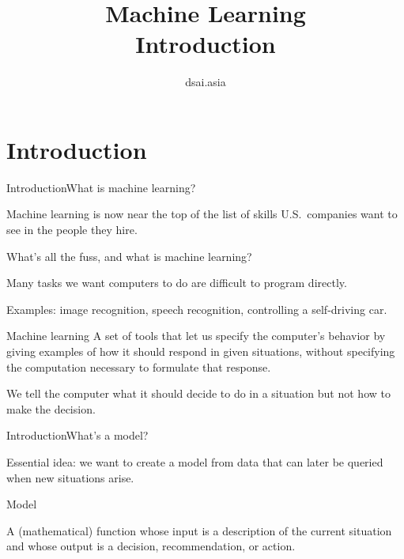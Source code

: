 \documentclass{beamer}
\title[Machine Learning]{Machine Learning\\Introduction}
\author{dsai.asia}
\institute[]{Asian Data Science and Artificial Intelligence Master's Program}
\date{}
\begin{document}


\frame{\titlepage}

\section{Introduction}

\begin{frame}{Introduction}{What is machine learning?}

  Machine learning is now near the top of the list of skills
  U.S.\ companies want to see in the people they hire.

  \medskip
  
  What's all the fuss, and what is machine learning?

  \medskip
  
  Many tasks we want computers to do are difficult to program
  directly.

  \medskip
  
  Examples: image recognition, speech recognition, controlling a
  self-driving car.

  \medskip

  \begin{block}{Machine learning}
  A set of tools that let us specify the computer's
  behavior by giving examples of \alert{how} it should respond in
  given situations, \alert{without specifying the computation
    necessary} to formulate that response.
  \end{block}

  \medskip
  
  We tell the computer \alert{what} it should decide to do in a
  situation but not \alert{how} to make the decision.

\end{frame}


\begin{frame}{Introduction}{What's a model?}

  Essential idea: we want to create a \alert{model} from data that can
  later be \alert{queried} when new situations arise.

  \medskip

  \begin{block}{Model}

    A (mathematical) function whose input is a \alert{description of
      the current situation} and whose output is a \alert{decision,
      recommendation, or action}.

  \end{block}

\end{frame}
\end{document}
